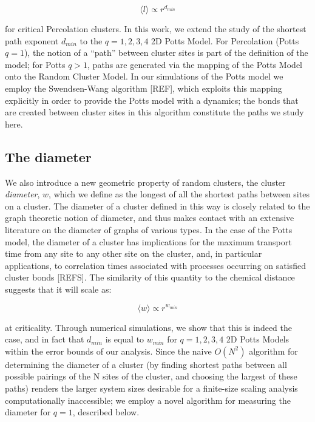 \documentclass[pre,preprint,11pt]{revtex4}
\newcommand{\lb}{{\langle}}
\newcommand{\rb}{{\rangle}}
\begin{document}
\begin{equation}
\lb l \rb \propto r^{d_{min}}
\end{equation}

for critical Percolation clusters. In this work, we extend the study of the shortest path exponent ${d_{min}}$ to the $q=1,2,3,4$ 2D Potts Model. For Percolation (Potts $q=1$), the notion of a ``path'' between cluster sites is part of the definition of the model; for Potts $q>1$, paths are generated via the mapping of the Potts Model onto the Random Cluster Model.  In our simulations of the Potts model we employ the Swendsen-Wang algorithm [REF], which exploits this mapping explicitly in order to provide the Potts model with a dynamics; the bonds that are created between cluster sites in this algorithm constitute the paths we study here.

\subsection{ The diameter} 

We also introduce a new geometric property of random clusters, the cluster {\it diameter}, $w$, which we define as the longest of all the shortest paths between sites on a cluster. The diameter of a cluster defined in this way is closely related to the graph theoretic notion of diameter, and thus makes contact with an extensive literature on the diameter of graphs of various types. In the case of the Potts model, the diameter of a cluster has implications for the maximum transport time from any site to any other site on the cluster, and, in particular applications, to correlation times associated with processes occurring on satisfied cluster bonds [REFS].  The similarity of this quantity to the chemical distance suggests that it will scale as:

\begin{equation}
\lb w \rb \propto r^{w_{min}}
\end{equation}

at criticality. Through numerical simulations, we show that this is indeed the case, and in fact that $d_{min}$ is equal to $w_{min}$ for $q=1,2,3,4$ 2D Potts Models within the error bounds of our analysis.   Since the naive $O(N^2)$ algorithm for determining the diameter of a cluster (by finding shortest paths between all possible pairings of the N sites of the cluster, and choosing the largest of these paths) renders the larger system sizes desirable for a finite-size scaling analysis computationally inaccessible; we employ a novel algorithm for measuring the diameter for $q=1$, described below.
\end{document}
